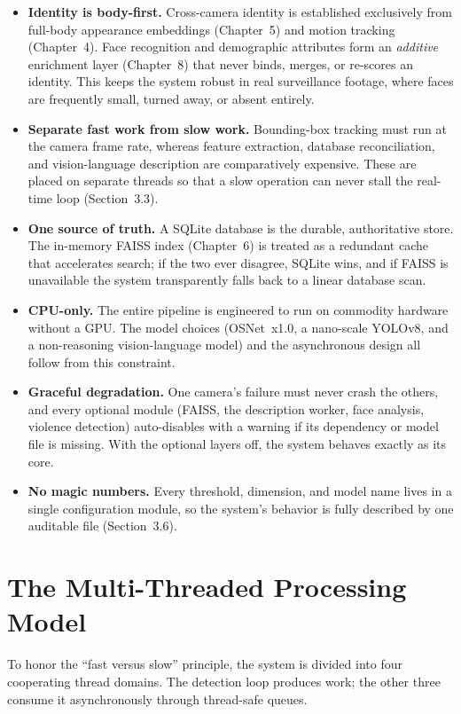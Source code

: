 \documentclass[12pt]{report}
\begin{document}
\begin{itemize}
    \item \textbf{Identity is body-first.} Cross-camera identity is established exclusively from full-body appearance embeddings (Chapter~5) and motion tracking (Chapter~4). Face recognition and demographic attributes form an \emph{additive} enrichment layer (Chapter~8) that never binds, merges, or re-scores an identity. This keeps the system robust in real surveillance footage, where faces are frequently small, turned away, or absent entirely.
    \item \textbf{Separate fast work from slow work.} Bounding-box tracking must run at the camera frame rate, whereas feature extraction, database reconciliation, and vision-language description are comparatively expensive. These are placed on separate threads so that a slow operation can never stall the real-time loop (Section~3.3).
    \item \textbf{One source of truth.} A SQLite database is the durable, authoritative store. The in-memory FAISS index (Chapter~6) is treated as a redundant cache that accelerates search; if the two ever disagree, SQLite wins, and if FAISS is unavailable the system transparently falls back to a linear database scan.
    \item \textbf{CPU-only.} The entire pipeline is engineered to run on commodity hardware without a GPU. The model choices (OSNet~x1.0, a nano-scale YOLOv8, and a non-reasoning vision-language model) and the asynchronous design all follow from this constraint.
    \item \textbf{Graceful degradation.} One camera's failure must never crash the others, and every optional module (FAISS, the description worker, face analysis, violence detection) auto-disables with a warning if its dependency or model file is missing. With the optional layers off, the system behaves exactly as its core.
    \item \textbf{No magic numbers.} Every threshold, dimension, and model name lives in a single configuration module, so the system's behavior is fully described by one auditable file (Section~3.6).
\end{itemize}

\section{The Multi-Threaded Processing Model}
To honor the ``fast versus slow'' principle, the system is divided into four cooperating thread domains. The detection loop produces work; the other three consume it asynchronously through thread-safe queues.
\end{document}
